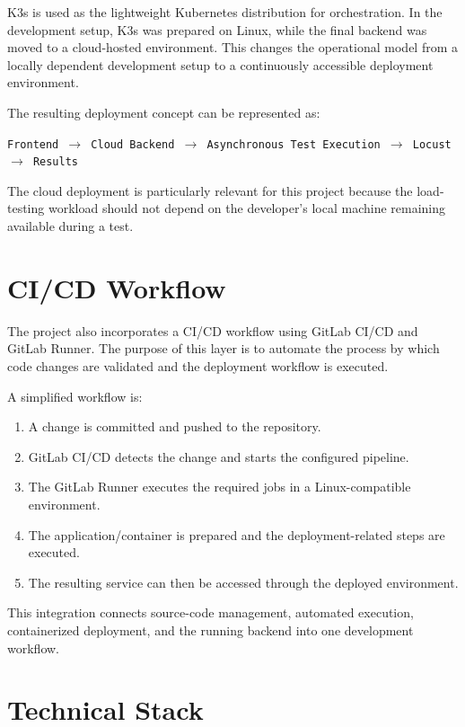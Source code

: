 \documentclass{tietreport}
\begin{document}
K3s is used as the lightweight Kubernetes distribution for orchestration. In the development setup, K3s was prepared on Linux, while the final backend was moved to a cloud-hosted environment. This changes the operational model from a locally dependent development setup to a continuously accessible deployment environment.

The resulting deployment concept can be represented as:

\begin{center}
\texttt{Frontend \(\rightarrow\) Cloud Backend \(\rightarrow\) Asynchronous Test Execution \(\rightarrow\) Locust \(\rightarrow\) Results}
\end{center}

The cloud deployment is particularly relevant for this project because the load-testing workload should not depend on the developer's local machine remaining available during a test.

\section{CI/CD Workflow}

The project also incorporates a CI/CD workflow using GitLab CI/CD and GitLab Runner. The purpose of this layer is to automate the process by which code changes are validated and the deployment workflow is executed.

A simplified workflow is:

\begin{enumerate}
    \item A change is committed and pushed to the repository.
    \item GitLab CI/CD detects the change and starts the configured pipeline.
    \item The GitLab Runner executes the required jobs in a Linux-compatible environment.
    \item The application/container is prepared and the deployment-related steps are executed.
    \item The resulting service can then be accessed through the deployed environment.
\end{enumerate}

This integration connects source-code management, automated execution, containerized deployment, and the running backend into one development workflow.

\section{Technical Stack}
\end{document}
